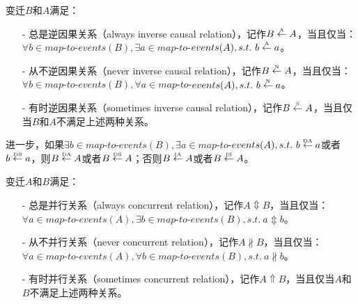 \begin{definition}[变迁间扩展不确定性精炼逆因果关系]\label{def:exroru_transition_inverse_causal}
变迁$B$和$A$满足：
  \begin{itemize}
    \item[-] 总是逆因果关系（always inverse causal relation），记作$B\overset{\text{\tiny{A}}}{\leftarrow}A$，当且仅当：$\forall b\in map$-$to$-$events(B),\exists a\in map$-$to$-$events(A),s.t.~b\overset{\text{\tiny{A}}}{\leftarrow}a$。
    \item[-] 从不逆因果关系（never inverse causal relation），记作$B\overset{\text{\tiny{N}}}{\leftarrow}A$，当且仅当：$\forall b\in map$-$to$-$events(B),\forall a\in map$-$to$-$events(A),s.t.~b\overset{\text{\tiny{N}}}{\leftarrow}a$。
    \item[-] 有时逆因果关系（sometimes inverse causal relation），记作$B\overset{\text{\tiny{S}}}{\leftarrow}A$，当且仅当$B$和$A$不满足上述两种关系。
  \end{itemize}
进一步，如果$\exists b\in map$-$to$-$events(B),\exists a\in map$-$to$-$events(A),s.t.~b\overset{\text{\tiny{DA}}}{\leftarrow}a$或者$b\overset{\text{\tiny{DS}}}{\leftarrow}a$，则$B\overset{\text{\tiny{DA}}}{\leftarrow}A$或者$B\overset{\text{\tiny{DS}}}{\leftarrow}A$；否则$B\overset{\text{\tiny{IA}}}{\leftarrow}A$或者$B\overset{\text{\tiny{IS}}}{\leftarrow}A$。
\end{definition}

\begin{definition}[变迁间扩展不确定性精炼并行关系]\label{def:exroru_transition_concurrent}
变迁$A$和$B$满足：
  \begin{itemize}
    \item[-] 总是并行关系（always concurrent relation），记作$A\Updownarrow B$，当且仅当：$\forall a\in map$-$to$-$events(A),\exists b\in map$-$to$-$events(B),s.t.~a\Updownarrow b$。
    \item[-] 从不并行关系（never concurrent relation），记作$A\nparallel B$，当且仅当：$\forall a\in map$-$to$-$events(A),\forall b\in map$-$to$-$events(B),s.t.~a\nparallel b$。
    \item[-] 有时并行关系（sometimes concurrent relation），记作$A\Uparrow B$，当且仅当$A$和$B$不满足上述两种关系。
  \end{itemize}
\end{definition}

